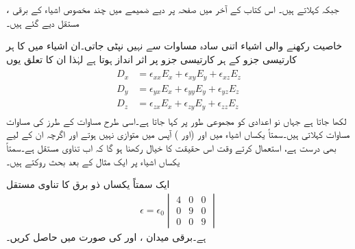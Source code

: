  ،   جبکہ     کہلاتے ہیں۔ اس کتاب کے آخر میں صفحہ  پر دیے ضمیمے میں چند مخصوص اشیاء کے برقی مستقل دیے گئے ہیں۔

 خاصیت رکھنے والی اشیاء اتنی سادہ مساوات سے نہیں نپٹی جاتی۔ان اشیاء میں  کا ہر کارتیسی جزو    کے ہر کارتیسی جزو پر اثر انداز ہوتا ہے لہٰذا ان کا تعلق یوں
\begin{gather}
\begin{aligned}\label{مساوت_کپیسٹر_تناوی-مساوات}
D_x&=\epsilon_{xx} E_x +\epsilon_{xy} E_y+\epsilon_{xz} E_z\\
D_y&=\epsilon_{yx} E_x +\epsilon_{yy} E_y+\epsilon_{yz} E_z\\
D_z&=\epsilon_{zx} E_x +\epsilon_{zy} E_y+\epsilon_{zz} E_z
\end{aligned}
\end{gather}
لکھا جاتا ہے جہاں نو اعدادی  کو مجموعی طور پر  کہا جاتا ہے۔اسی طرح مساوات  کے طرز کی مساوات  مساوات کہلاتی ہیں۔سمتاً یکساں اشیاء میں  اور   (اور ) آپس میں متوازی نہیں  ہوتے اور اگرچہ  ان کے لیے بھی درست ہے،  استعمال کرتے وقت  اس حقیقت کا خیال رکھنا ہو گا کہ  اب تناوی مستقل ہے۔سمتاً یکساں اشیاء پر ایک مثال کے بعد بحث روکتے ہیں۔

ایک سمتاً یکساں ذو برق کا تناوی مستقل
\begin{align*}
\epsilon=\epsilon_0 
\begin{vmatrix}
4 & 0 & 0 \\
0 & 9 & 0\\
0 & 0 &9
\end{vmatrix}
\end{align*}
ہے۔برقی میدان ،  اور  کی صورت میں  حاصل کریں۔

